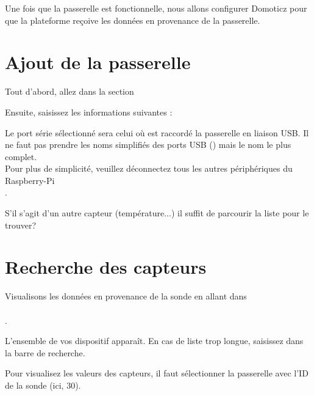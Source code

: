 Une fois que la passerelle est fonctionnelle, nous allons configurer Domoticz pour que la plateforme reçoive les données en provenance de la passerelle.

\section{Ajout de la passerelle}

Tout d'abord, allez dans la section 


Ensuite, saisissez les informations suivantes :


Le port série sélectionné sera celui où est raccordé la passerelle en liaison USB.
Il ne faut pas prendre les noms simplifiés des ports USB () mais le nom le plus complet.\\
Pour plus de simplicité, veuillez déconnectez tous les autres périphériques du Raspberry-Pi\\.


S'il s'agit d'un autre capteur (température...) il suffit de parcourir la liste pour le trouver?


\section{Recherche des capteurs}

Visualisons les données en provenance de la sonde en allant dans \\
\\.

L'ensemble de vos dispositif apparaît. En cas de liste trop longue, saisissez  dans la barre de recherche.








Pour visualisez les valeurs des capteurs, il faut sélectionner la passerelle avec l'ID de la sonde (ici, 30).


